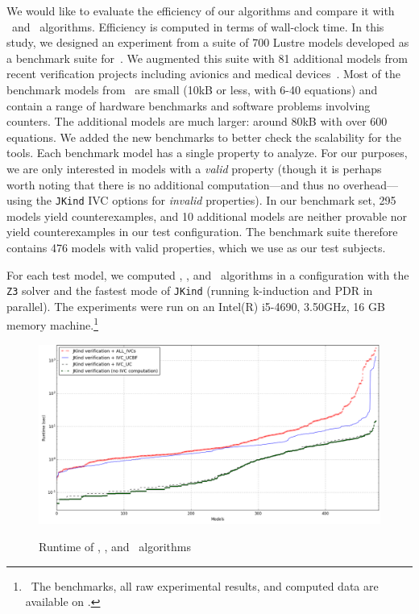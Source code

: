 
\newcommand{\takeaway}[1]{
\vspace{6pt}
\noindent\fbox{\parbox{\textwidth}{#1}}
\vspace{6pt}
}
 
 We would like to evaluate the efficiency 
 of our algorithms and compare it with \ucalg ~and \ucbfalg ~algorithms. 
 Efficiency is computed in terms of wall-clock time. 
 In this study, we designed an experiment from a suite of 700 Lustre models developed
as a benchmark suite for~\cite{Hagen08:FMCAD}. 
We augmented this suite
with 81 additional models from recent verification projects including
avionics and medical devices~\cite{QFCS15:backes,hilt2013}.
 Most of
the benchmark models from~\cite{Hagen08:FMCAD} are small (10kB or less,
with 6-40 equations) and contain a range of hardware benchmarks and
software problems involving counters. 
The additional models are much
larger: around 80kB with over 600 equations. We added the new
benchmarks to better check the scalability for the tools. 
Each benchmark model has a single property to analyze.  For our purposes, we are only interested in models with a {\em valid} property (though it is perhaps worth noting that there is no additional computation---and thus no overhead---using the \texttt{JKind} IVC options for {\em invalid} properties).  In our benchmark set, 295 models yield counterexamples, and 10 additional models are neither provable nor yield counterexamples in our test configuration.  The benchmark suite therefore contains 476 models with valid properties, which we use as our test subjects.

For each test model, we computed \aivcalg , \ucalg , and \ucbfalg ~algorithms
in a configuration with
the \texttt{Z3} solver and the fastest mode of \texttt{JKind} (running k-induction and PDR in parallel). The experiments
were run on an  Intel(R) i5-4690, 3.50GHz,
16 GB memory machine.\footnote{\noindent ~The benchmarks, all raw experimental results,
  and computed data are available on \cite{expr}.}
  
\begin{figure}[t]
 \centering
  \includegraphics[width=\textwidth]{figs/performance-sorted.png}
  \label{fig:performance}
  \vspace{-0.2in}
  \caption{Runtime of \aivcalg, \ucbfalg, and \ucalg ~algorithms}
\end{figure}  
  
